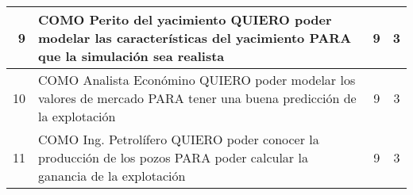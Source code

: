 \begin{center}
\begin{tabular}{| r | p{10cm} | c | c | }
    9 & COMO Perito del yacimiento QUIERO poder modelar las características del yacimiento PARA 
    que la simulación sea realista & 9 & 3\\ \hline
    
    10 & COMO Analista Económino QUIERO poder modelar los valores de mercado PARA 
    tener una buena predicción de la explotación & 9 & 3\\ \hline
    
    11 & COMO Ing. Petrolífero QUIERO poder conocer la producción de los pozos PARA poder calcular 
    la ganancia de la explotación & 9 & 3\\ \hline
  \end{tabular}
\end{center}


